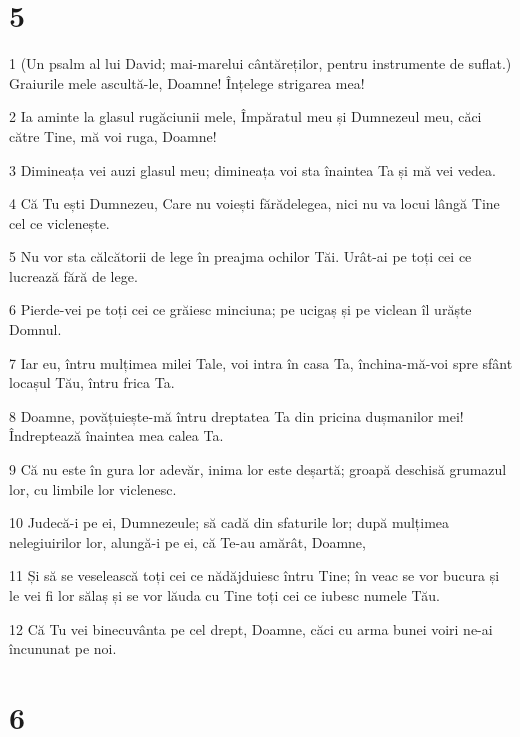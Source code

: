 \chapter{5}

\par 1 (Un psalm al lui David; mai-marelui cântăreților, pentru instrumente de suflat.) Graiurile mele ascultă-le, Doamne! Înțelege strigarea mea!
\par 2 Ia aminte la glasul rugăciunii mele, Împăratul meu și Dumnezeul meu, căci către Tine, mă voi ruga, Doamne!
\par 3 Dimineața vei auzi glasul meu; dimineața voi sta înaintea Ta și mă vei vedea.
\par 4 Că Tu ești Dumnezeu, Care nu voiești fărădelegea, nici nu va locui lângă Tine cel ce viclenește.
\par 5 Nu vor sta călcătorii de lege în preajma ochilor Tăi. Urât-ai pe toți cei ce lucrează fără de lege.
\par 6 Pierde-vei pe toți cei ce grăiesc minciuna; pe ucigaș și pe viclean îl urăște Domnul.
\par 7 Iar eu, întru mulțimea milei Tale, voi intra în casa Ta, închina-mă-voi spre sfânt locașul Tău, întru frica Ta.
\par 8 Doamne, povățuiește-mă întru dreptatea Ta din pricina dușmanilor mei! Îndreptează înaintea mea calea Ta.
\par 9 Că nu este în gura lor adevăr, inima lor este deșartă; groapă deschisă grumazul lor, cu limbile lor viclenesc.
\par 10 Judecă-i pe ei, Dumnezeule; să cadă din sfaturile lor; după mulțimea nelegiuirilor lor, alungă-i pe ei, că Te-au amărât, Doamne,
\par 11 Și să se veselească toți cei ce nădăjduiesc întru Tine; în veac se vor bucura și le vei fi lor sălaș și se vor lăuda cu Tine toți cei ce iubesc numele Tău.
\par 12 Că Tu vei binecuvânta pe cel drept, Doamne, căci cu arma bunei voiri ne-ai încununat pe noi.

\chapter{6}

